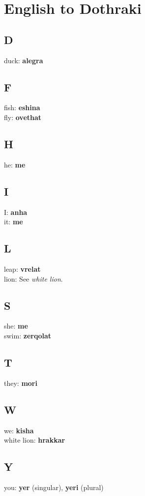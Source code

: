 \section*{English to Dothraki}
\begin{multicols}{2}
\subsection*{D}
duck: \textbf{alegra} \\
\subsection*{F}
fish: \textbf{eshina} \\
fly: \textbf{ovethat} \\
\subsection*{H}
he: \textbf{me} \\
\subsection*{I}
I: \textbf{anha} \\
it: \textbf{me} \\
\subsection*{L}
leap: \textbf{vrelat} \\
lion: See \textit{white lion}.
\subsection*{S}
she: \textbf{me} \\
swim: \textbf{zerqolat} \\
\subsection*{T}
they: \textbf{mori} \\
\subsection*{W}
we: \textbf{kisha} \\
white lion: \textbf{hrakkar} \\
\subsection*{Y}
you: \textbf{yer} (singular), \textbf{yeri} (plural) \\
\end{multicols}
